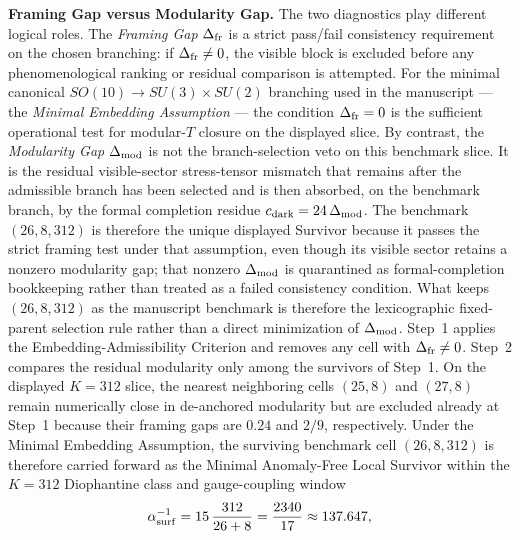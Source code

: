 \documentclass[11pt]{article}
\begin{document}
\medskip
\noindent\textbf{Framing Gap versus Modularity Gap.}
The two diagnostics play different logical roles. The \emph{Framing Gap} $\Delta_{\rm fr}$ is a strict pass/fail consistency requirement on the chosen branching: if $\Delta_{\rm fr}\neq0$, the visible block is excluded before any phenomenological ranking or residual comparison is attempted. For the minimal canonical $SO(10)\to SU(3)\times SU(2)$ branching used in the manuscript --- the \emph{Minimal Embedding Assumption} --- the condition $\Delta_{\rm fr}=0$ is the sufficient operational test for modular-$T$ closure on the displayed slice. By contrast, the \emph{Modularity Gap} $\Delta_{\rm mod}$ is not the branch-selection veto on this benchmark slice. It is the residual visible-sector stress-tensor mismatch that remains after the admissible branch has been selected and is then absorbed, on the benchmark branch, by the formal completion residue $c_{\rm dark}=24\,\Delta_{\rm mod}$. The benchmark $(26,8,312)$ is therefore the unique displayed Survivor because it passes the strict framing test under that assumption, even though its visible sector retains a nonzero modularity gap; that nonzero $\Delta_{\rm mod}$ is quarantined as formal-completion bookkeeping rather than treated as a failed consistency condition.
What keeps $(26,8,312)$ as the manuscript benchmark is therefore the lexicographic fixed-parent selection rule rather than a direct minimization of $\Delta_{\rm mod}$. Step~1 applies the Embedding-Admissibility Criterion and removes any cell with $\Delta_{\rm fr}\neq0$. Step~2 compares the residual modularity only among the survivors of Step~1. On the displayed $K=312$ slice, the nearest neighboring cells $(25,8)$ and $(27,8)$ remain numerically close in de-anchored modularity but are excluded already at Step~1 because their framing gaps are $0.24$ and $2/9$, respectively. Under the Minimal Embedding Assumption, the surviving benchmark cell $(26,8,312)$ is therefore carried forward as the Minimal Anomaly-Free Local Survivor within the $K=312$ Diophantine class and gauge-coupling window
\begin{equation}
 \alpha^{-1}_{\rm surf}
 =
 15\,\frac{312}{26+8}
 =
 \frac{2340}{17}
 \approx 137.647,
\end{equation}
\end{document}
